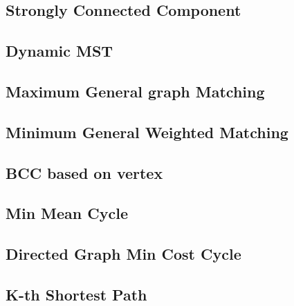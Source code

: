 \documentclass[a4paper,10pt,twocolumn,oneside]{article}
\begin{document}
\subsection{Strongly Connected Component}


\subsection{Dynamic MST}


\subsection{Maximum General graph Matching}


\subsection{Minimum General Weighted Matching}


%

%

\subsection{BCC based on vertex}


\subsection{Min Mean Cycle}


\subsection{Directed Graph Min Cost Cycle}


\subsection{K-th Shortest Path}

\end{document}
